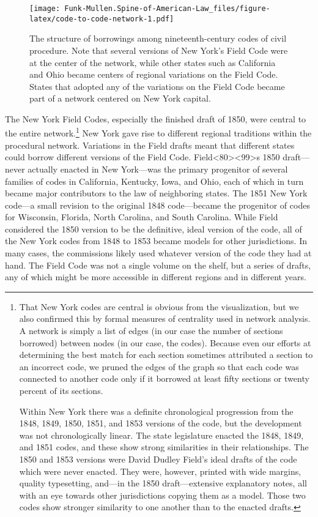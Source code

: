 \documentclass[12pt,]{article}
\let\rmarkdownfootnote\footnote%
\def\footnote{\protect\rmarkdownfootnote}
\begin{document}
\begin{figure}
\centering
\texttt{[image: Funk-Mullen.Spine-of-American-Law\_files/figure-latex/code-to-code-network-1.pdf]}
\caption{The structure of borrowings among nineteenth-century codes of
civil procedure. Note that several versions of New York's Field Code
were at the center of the network, while other states such as California
and Ohio became centers of regional variations on the Field Code. States
that adopted any of the variations on the Field Code became part of a
network centered on New York capital.}
\end{figure}

The New York Field Codes, especially the finished draft of 1850, were
central to the entire network.\footnote{That New York codes are central
  is obvious from the visualization, but we also confirmed this by
  formal measures of centrality used in network analysis. A network is
  simply a list of edges (in our case the number of sections borrowed)
  between nodes (in our case, the codes). Because even our efforts at
  determining the best match for each section sometimes attributed a
  section to an incorrect code, we pruned the edges of the graph so that
  each code was connected to another code only if it borrowed at least
  fifty sections or twenty percent of its sections.

  Within New York there was a definite chronological progression from
  the 1848, 1849, 1850, 1851, and 1853 versions of the code, but the
  development was not chronologically linear. The state legislature
  enacted the 1848, 1849, and 1851 codes, and these show strong
  similarities in their relationships. The 1850 and 1853 versions were
  David Dudley Field's ideal drafts of the code which were never
  enacted. They were, however, printed with wide margins, quality
  typesetting, and---in the 1850 draft---extensive explanatory notes,
  all with an eye towards other jurisdictions copying them as a model.
  Those two codes show stronger similarity to one another than to the
  enacted drafts.} New York gave rise to different regional traditions
within the procedural network. Variations in the Field drafts meant that
different states could borrow different versions of the Field Code.
Field\textless80\textgreater\textless99\textgreater s 1850 draft---never
actually enacted in New York---was the primary progenitor of several
families of codes in California, Kentucky, Iowa, and Ohio, each of which
in turn became major contributors to the law of neighboring states. The
1851 New York code---a small revision to the original 1848 code---became
the progenitor of codes for Wisconsin, Florida, North Carolina, and
South Carolina. While Field considered the 1850 version to be the
definitive, ideal version of the code, all of the New York codes from
1848 to 1853 became models for other jurisdictions. In many cases, the
commissions likely used whatever version of the code they had at hand.
The Field Code was not a single volume on the shelf, but a series of
drafts, any of which might be more accessible in different regions and
in different years.
\end{document}

